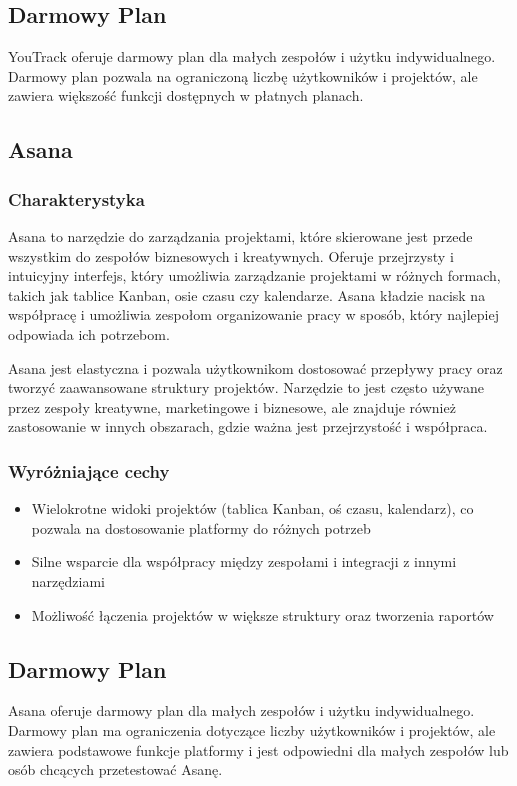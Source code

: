 \subsection*{Darmowy Plan}
YouTrack oferuje darmowy plan dla małych zespołów i użytku indywidualnego. Darmowy plan pozwala na ograniczoną liczbę użytkowników i projektów, ale zawiera większość funkcji dostępnych w płatnych planach.

\subsection{Asana}
\subsubsection*{Charakterystyka}
Asana to narzędzie do zarządzania projektami, które skierowane jest przede wszystkim do zespołów biznesowych i kreatywnych. Oferuje przejrzysty i intuicyjny interfejs, który umożliwia zarządzanie projektami w różnych formach,
takich jak tablice Kanban, osie czasu czy kalendarze. Asana kładzie nacisk na współpracę i umożliwia zespołom organizowanie pracy w sposób, który najlepiej odpowiada ich potrzebom.

Asana jest elastyczna i pozwala użytkownikom dostosować przepływy pracy oraz tworzyć zaawansowane struktury projektów. Narzędzie to jest często używane przez zespoły kreatywne, marketingowe i biznesowe, ale znajduje również
zastosowanie w innych obszarach, gdzie ważna jest przejrzystość i współpraca.
\subsubsection*{Wyróżniające cechy}
\begin{itemize}
    \item Wielokrotne widoki projektów (tablica Kanban, oś czasu, kalendarz), co pozwala na dostosowanie platformy do różnych potrzeb
    \item Silne wsparcie dla współpracy między zespołami i integracji z innymi narzędziami
    \item Możliwość łączenia projektów w większe struktury oraz tworzenia raportów
\end{itemize}
\subsection*{Darmowy Plan}
Asana oferuje darmowy plan dla małych zespołów i użytku indywidualnego. Darmowy plan ma ograniczenia dotyczące liczby użytkowników i projektów, ale zawiera podstawowe funkcje platformy
i jest odpowiedni dla małych zespołów lub osób chcących przetestować Asanę.

